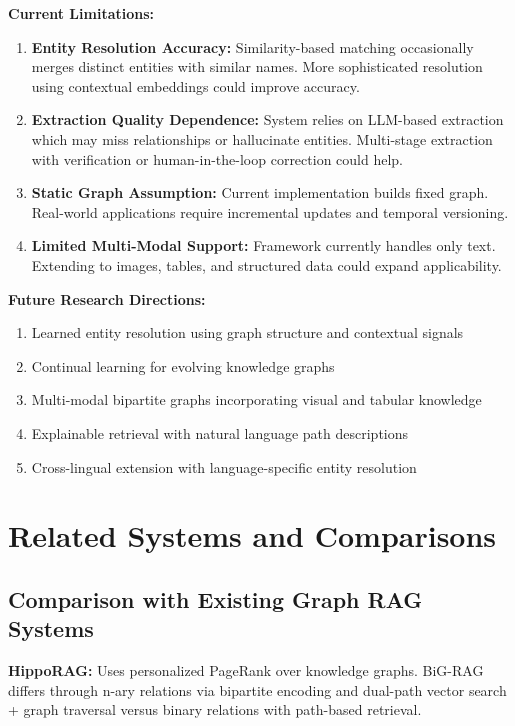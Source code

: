 \documentclass[11pt,a4paper]{article}
\begin{document}
\textbf{Current Limitations:}

\begin{enumerate}
    \item \textbf{Entity Resolution Accuracy:} Similarity-based matching occasionally merges distinct entities with similar names. More sophisticated resolution using contextual embeddings could improve accuracy.

    \item \textbf{Extraction Quality Dependence:} System relies on LLM-based extraction which may miss relationships or hallucinate entities. Multi-stage extraction with verification or human-in-the-loop correction could help.

    \item \textbf{Static Graph Assumption:} Current implementation builds fixed graph. Real-world applications require incremental updates and temporal versioning.

    \item \textbf{Limited Multi-Modal Support:} Framework currently handles only text. Extending to images, tables, and structured data could expand applicability.
\end{enumerate}

\textbf{Future Research Directions:}

\begin{enumerate}
    \item Learned entity resolution using graph structure and contextual signals
    \item Continual learning for evolving knowledge graphs
    \item Multi-modal bipartite graphs incorporating visual and tabular knowledge
    \item Explainable retrieval with natural language path descriptions
    \item Cross-lingual extension with language-specific entity resolution
\end{enumerate}

\section{Related Systems and Comparisons}

\subsection{Comparison with Existing Graph RAG Systems}

\textbf{HippoRAG:} Uses personalized PageRank over knowledge graphs. BiG-RAG differs through n-ary relations via bipartite encoding and dual-path vector search + graph traversal versus binary relations with path-based retrieval.
\end{document}
